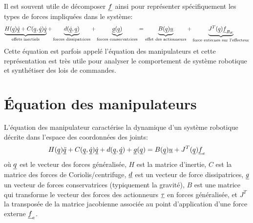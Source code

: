 Il est souvent utile de décomposer $\underline{f}$ ainsi pour représenter spécifiquement les types de forces impliquées dans le système:
%
\begin{align}
\underbrace{
H(\underline{q}) \underline{\ddot{q}} + C(\underline{q},\underline{\dot{q}}) \underline{\dot{q}} 
}_{\text{effets inertiels}}
+ 
\underbrace{
d(\underline{\dot{q}},\underline{q}) 
}_{\text{forces dissipatrices}}
+ 
\underbrace{
\underline{g}(\underline{q}) 
}_{\text{forces conservatrices}}
= 
\underbrace{
B(\underline{q}) \underline{u} 
}_{\text{effet des actionneurs}}
+
\underbrace{
J^T(\underline{q}) \underline{f}_{R_E}
}_{\text{force externes sur l'effecteur}}
\label{eq:manipulator}
\end{align}
%
Cette équation est parfois appelé l'équation des manipulateurs et cette représentation est très utile pour analyser le comportement de système robotique et synthétiser des lois de commandes.



\section{Équation des manipulateurs}
\label{sec:manipeq}

L'équation des manipulateur caractérise la dynamique d'un système robotique décrite dans l'espace des coordonnées des joints:
%
\begin{align}
H(\underline{q}) \underline{\ddot{q}} + C(\underline{q},\underline{\dot{q}}) \underline{\dot{q}} + d(\underline{q}, \underline{\dot{q}}) + \underline{g}(\underline{q}) = B(\underline{q}) \underline{u}  + J^T(\underline{q}) \underline{f}_e
\label{eq:manipulator}
\end{align}
%
où $\underline{q}$ est le vecteur des forces généralisée, $H$ est la matrice d'inertie, $C$ est la matrice des forces de Coriolis/centrifuge, $\underline{d}$ est un vecteur de force dissipatrices, $\underline{g}$ un vecteur de forces conservatrices (typiquement la gravité), $B$ est une matrice qui transforme le vecteur des forces des actionneurs $\underline{\tau}$ en forces généralisée, et $J^T$ la transposée de la matrice jacobienne associée au point d'application d'une force externe $\underline{f}_e$.

